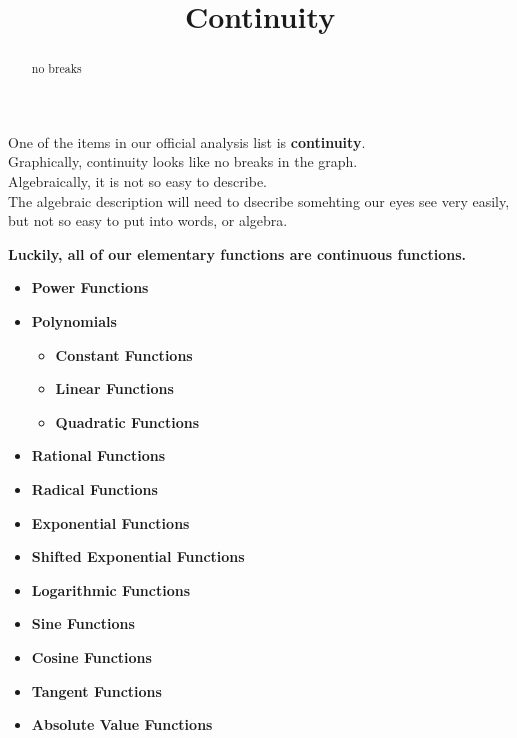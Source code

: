 \documentclass{ximera}
\title{Continuity}
\begin{document}
\begin{abstract}
no breaks
\end{abstract}
\maketitle





One of the items in our official analysis list is \textbf{continuity}. \\

Graphically, continuity looks like no breaks in the graph. \\

Algebraically, it is not so easy to describe. \\


The algebraic description will need to dsecribe somehting our eyes see very easily, but not so easy to put into words, or algebra. \\



\begin{center}
\textbf{\textcolor{red!70!black}{Luckily, all of our elementary functions are continuous functions.}}   \\
\end{center}





\begin{itemize}
	\item \textbf{\textcolor{blue!55!black}{Power Functions}} 
	\item \textbf{\textcolor{blue!55!black}{Polynomials}}
	\begin{itemize}
		\item \textbf{\textcolor{purple!85!blue}{Constant Functions}}
		\item \textbf{\textcolor{purple!85!blue}{Linear Functions}}
		\item \textbf{\textcolor{purple!85!blue}{Quadratic Functions}}
	\end{itemize}
	\item \textbf{\textcolor{blue!55!black}{Rational Functions}}
	\item \textbf{\textcolor{blue!55!black}{Radical Functions}}
	\item \textbf{\textcolor{blue!55!black}{Exponential Functions}}
	\item \textbf{\textcolor{blue!55!black}{Shifted Exponential Functions}}
	\item \textbf{\textcolor{blue!55!black}{Logarithmic Functions}}
	\item \textbf{\textcolor{blue!55!black}{Sine Functions}}
	\item \textbf{\textcolor{blue!55!black}{Cosine Functions}}
	\item \textbf{\textcolor{blue!55!black}{Tangent Functions}}
	\item \textbf{\textcolor{blue!55!black}{Absolute Value Functions}}
\end{itemize}
\end{document}
